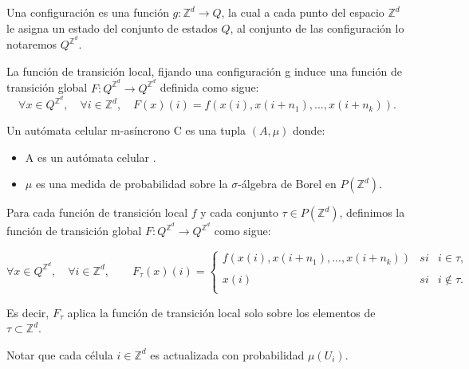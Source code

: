 \documentclass[../proyecto.tex]{memoir}
\begin{document}
\begin{defi}
Una configuración es una función $g: \mathds{Z}^{d} \rightarrow Q$, la cual a cada punto del espacio $\mathds{Z}^{d}$ le asigna un estado del conjunto de estados $Q$, al conjunto de las configuración lo notaremos $Q^{\mathds{Z}^{d}}$. 
\end{defi}

\begin{defi}
La función de transición local, fijando una configuración g induce una función de transición global $F:Q^{\mathds{Z}^{d}} \rightarrow Q^{\mathds{Z}^{d}}$ definida como sigue:
$$
\forall x \in Q^{\mathds{Z}^{d}}, \quad \forall i \in \mathds{Z}^{d}, \quad F(x)(i) = f(x(i),x(i+n_{1}),...,x(i+n_{k})).
$$
\end{defi}

\begin{defi}
Un autómata celular m-asíncrono C es una tupla $(A, \mu)$ donde: 
\begin{itemize}
\item A es un autómata celular .
\item $\mu$ es una medida de probabilidad sobre la $\sigma$-álgebra de Borel en $P(\mathds{Z}^{d})$.
\end{itemize} 
\end{defi}
\begin{defi}

Para cada función de transición local $f$ y cada conjunto $\tau \in P(\mathds{Z}^{d})$, definimos la función de transición global $F:Q^{\mathds{Z}^{d}} \rightarrow Q^{\mathds{Z}^{d}}$ como sigue:

\begin{equation*}
	\forall x \in Q^{\mathds{Z}^{d}}, \quad \forall i \in \mathds{Z}^{d}, \qquad
	F_{\tau}(x)(i) = \left\{ \begin{array}{lcc}
             f(x(i),x(i+n_{1}),...,x(i+n_{k})) &   si  & i \in \tau ,\\
             \\ x(i) & si  & i \notin \tau .\\
             \end{array}
             \right.
\end{equation*}

Es decir, $F_{\tau}$ aplica la función de transición local solo sobre los elementos de $\tau \subset \mathds{Z}^{d}$. 
\end{defi}

Notar que cada célula $i \in \mathds{Z}^{d}$ es actualizada con probabilidad $\mu(U_{i})$.
\end{document}
